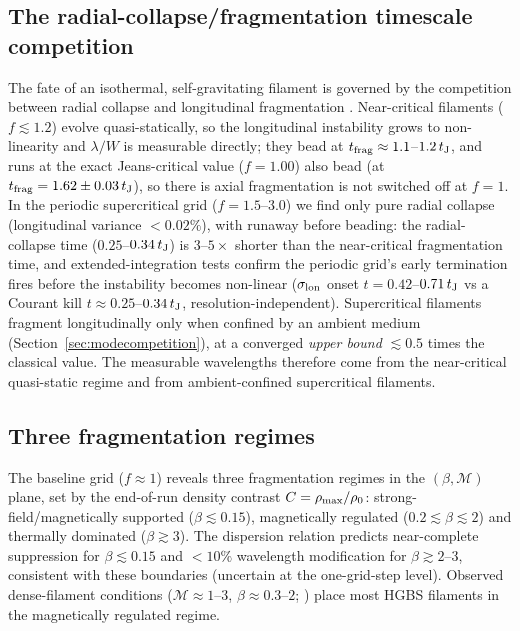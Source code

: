 \documentclass[usenatbib,twoside,twocolumn]{mnras}
\begin{document}
\subsection{The radial-collapse/fragmentation timescale competition}
\label{sec:regimes}

The fate of an isothermal, self-gravitating filament is governed by the competition between radial collapse and longitudinal fragmentation \citep{Inutsuka1997,Pon2012}. Near-critical filaments ($f\lesssim1.2$) evolve quasi-statically, so the longitudinal instability grows to non-linearity and $\lambda/W$ is measurable directly; they bead at $t_{\rm frag}\approx1.1$--$1.2\,t_{\rm J}$, and runs at the exact Jeans-critical value ($f=1.00$) also bead (at $t_{\rm frag}=1.62\pm0.03\,t_{\rm J}$), so there is axial fragmentation is not switched off at $f=1$. In the periodic supercritical grid ($f=1.5$--$3.0$) we find only pure radial collapse (longitudinal variance $<0.02\%$), with runaway before beading: the radial-collapse time ($0.25$--$0.34\,t_{\rm J}$) is $3$--$5\times$ shorter than the near-critical fragmentation time, and extended-integration tests confirm the periodic grid's early termination fires before the instability becomes non-linear ($\sigma_{\rm lon}$ onset $t=0.42$--$0.71\,t_{\rm J}$ vs a Courant kill $t\approx0.25$--$0.34\,t_{\rm J}$, resolution-independent). Supercritical filaments fragment longitudinally only when confined by an ambient medium (Section~\ref{sec:modecompetition}), at a converged \emph{upper bound} $\lesssim0.5$ times the classical value. The measurable wavelengths therefore come from the near-critical quasi-static regime and from ambient-confined supercritical filaments.

\subsection{Three fragmentation regimes}

The baseline grid ($f\approx1$) reveals three fragmentation regimes in the $(\beta,\mathcal{M})$ plane, set by the end-of-run density contrast $C=\rho_{\rm max}/\rho_0$: strong-field/magnetically supported ($\beta\lesssim0.15$), magnetically regulated ($0.2\lesssim\beta\lesssim2$) and thermally dominated ($\beta\gtrsim3$). The dispersion relation \citep{Nakamura1993} predicts near-complete suppression for $\beta\lesssim0.15$ and $<10\%$ wavelength modification for $\beta\gtrsim2$--$3$, consistent with these boundaries (uncertain at the one-grid-step level). Observed dense-filament conditions ($\mathcal{M}\approx1$--$3$, $\beta\approx0.3$--$2$; \citealt{Arzoumanian2019,Planck2016,Pattle2018}) place most HGBS filaments in the magnetically regulated regime.
\end{document}
